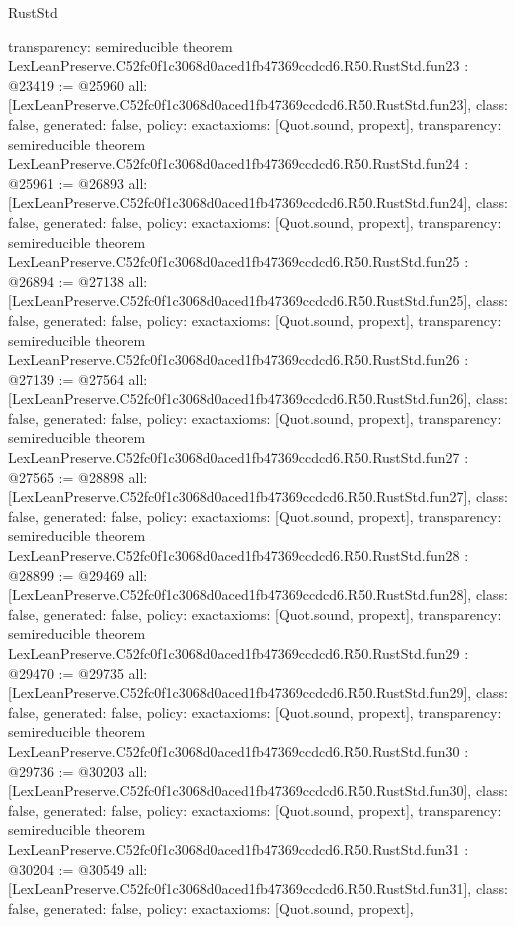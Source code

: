 \begin{lexlean}{RustStd}
\begin{coremodule}
{  transparency: semireducible
}
theorem LexLeanPreserve.C52fc0f1c3068d0aced1fb47369ccdcd6.R50.RustStd.fun23 : @23419 := @25960 {
  all: [LexLeanPreserve.C52fc0f1c3068d0aced1fb47369ccdcd6.R50.RustStd.fun23],
  class: false,
  generated: false,
  policy: exact{axioms: [Quot.sound, propext]},
  transparency: semireducible
}
theorem LexLeanPreserve.C52fc0f1c3068d0aced1fb47369ccdcd6.R50.RustStd.fun24 : @25961 := @26893 {
  all: [LexLeanPreserve.C52fc0f1c3068d0aced1fb47369ccdcd6.R50.RustStd.fun24],
  class: false,
  generated: false,
  policy: exact{axioms: [Quot.sound, propext]},
  transparency: semireducible
}
theorem LexLeanPreserve.C52fc0f1c3068d0aced1fb47369ccdcd6.R50.RustStd.fun25 : @26894 := @27138 {
  all: [LexLeanPreserve.C52fc0f1c3068d0aced1fb47369ccdcd6.R50.RustStd.fun25],
  class: false,
  generated: false,
  policy: exact{axioms: [Quot.sound, propext]},
  transparency: semireducible
}
theorem LexLeanPreserve.C52fc0f1c3068d0aced1fb47369ccdcd6.R50.RustStd.fun26 : @27139 := @27564 {
  all: [LexLeanPreserve.C52fc0f1c3068d0aced1fb47369ccdcd6.R50.RustStd.fun26],
  class: false,
  generated: false,
  policy: exact{axioms: [Quot.sound, propext]},
  transparency: semireducible
}
theorem LexLeanPreserve.C52fc0f1c3068d0aced1fb47369ccdcd6.R50.RustStd.fun27 : @27565 := @28898 {
  all: [LexLeanPreserve.C52fc0f1c3068d0aced1fb47369ccdcd6.R50.RustStd.fun27],
  class: false,
  generated: false,
  policy: exact{axioms: [Quot.sound, propext]},
  transparency: semireducible
}
theorem LexLeanPreserve.C52fc0f1c3068d0aced1fb47369ccdcd6.R50.RustStd.fun28 : @28899 := @29469 {
  all: [LexLeanPreserve.C52fc0f1c3068d0aced1fb47369ccdcd6.R50.RustStd.fun28],
  class: false,
  generated: false,
  policy: exact{axioms: [Quot.sound, propext]},
  transparency: semireducible
}
theorem LexLeanPreserve.C52fc0f1c3068d0aced1fb47369ccdcd6.R50.RustStd.fun29 : @29470 := @29735 {
  all: [LexLeanPreserve.C52fc0f1c3068d0aced1fb47369ccdcd6.R50.RustStd.fun29],
  class: false,
  generated: false,
  policy: exact{axioms: [Quot.sound, propext]},
  transparency: semireducible
}
theorem LexLeanPreserve.C52fc0f1c3068d0aced1fb47369ccdcd6.R50.RustStd.fun30 : @29736 := @30203 {
  all: [LexLeanPreserve.C52fc0f1c3068d0aced1fb47369ccdcd6.R50.RustStd.fun30],
  class: false,
  generated: false,
  policy: exact{axioms: [Quot.sound, propext]},
  transparency: semireducible
}
theorem LexLeanPreserve.C52fc0f1c3068d0aced1fb47369ccdcd6.R50.RustStd.fun31 : @30204 := @30549 {
  all: [LexLeanPreserve.C52fc0f1c3068d0aced1fb47369ccdcd6.R50.RustStd.fun31],
  class: false,
  generated: false,
  policy: exact{axioms: [Quot.sound, propext]},
}
\end{coremodule}
\end{lexlean}
